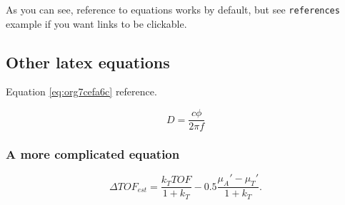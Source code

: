As you can see, reference to equations works by default, but see \texttt{references}
example if you want links to be clickable.

\subsection{Other latex equations}
\label{sec:org13e7f5c}
Equation \ref{eq:org7cefa6c} reference.

\begin{equation}
\label{eq:org7cefa6c}
D = \frac{c\phi}{2\pi f}
\end{equation}

\subsubsection{A more complicated equation}
\label{sec:org66ecf89}

\begin{equation}
\Delta TOF_{est} = \frac{k_T TOF}{1+k_T } - 0.5 \frac{\mu_A' - \mu_T'}{1+k_T}.
\end{equation}


